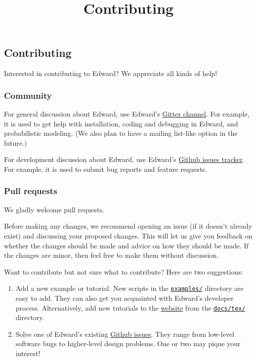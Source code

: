 \title{Contributing}

\subsection{Contributing}

Interested in contributing to Edward? We appreciate all kinds of help!

\subsubsection{Community}

For general discussion about Edward, use Edward's
\href{http://gitter.im/blei-lab/edward}{Gitter channel}.
For example, it is used to get help with installation, coding and
debugging in Edward, and probabilistic modeling.
(We also plan to have a mailing list-like option in the future.)

For development discussion about Edward, use Edward's
\href{https://github.com/blei-lab/edward/issues}{Github issues tracker}.
For example, it is used to submit bug reports and feature requests.

\subsubsection{Pull requests}

We gladly welcome pull requests.

Before making any changes, we recommend opening an issue (if it
doesn't already exist) and discussing your proposed changes. This will
let us give you feedback on whether the changes should be made and
advice on how they should be made.
If the changes are minor, then feel free to make them
without discussion.

Want to contribute but not sure what to contribute? Here are two
suggestions:
\begin{enumerate}
\item
Add a new example or tutorial.
New scripts in the
\href{https://github.com/blei-lab/edward/tree/master/examples}
{\texttt{examples/}} directory are easy to add. They can also
get you acquainted with Edward's developer process.
Alternatively, add new tutorials to the
\href{tutorials}{website} from the
\href{https://github.com/blei-lab/edward/tree/master/docs/tex}
{\texttt{docs/tex/}} directory.
\item
Solve one of Edward's existing
\href{https://github.com/blei-lab/edward/issues}{Github issues}.
They range from low-level software bugs to higher-level design problems.
One or two may pique your interest!
\end{enumerate}

